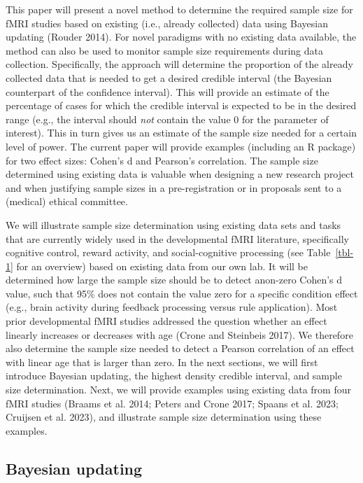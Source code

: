 \documentclass[
  letterpaper,
  DIV=11,
  numbers=noendperiod]{scrartcl}
\begin{document}
This paper will present a novel method to determine the required sample
size for fMRI studies based on existing (i.e., already collected) data
using Bayesian updating (Rouder 2014). For novel paradigms with no
existing data available, the method can also be used to monitor sample
size requirements during data collection. Specifically, the approach
will determine the proportion of the already collected data that is
needed to get a desired credible interval (the Bayesian counterpart of
the confidence interval). This will provide an estimate of the
percentage of cases for which the credible interval is expected to be in
the desired range (e.g., the interval should \emph{not} contain the
value 0 for the parameter of interest). This in turn gives us an
estimate of the sample size needed for a certain level of power. The
current paper will provide examples (including an R package) for two
effect sizes: Cohen's d and Pearson's correlation. The sample size
determined using existing data is valuable when designing a new research
project and when justifying sample sizes in a pre-registration or in
proposals sent to a (medical) ethical committee.

We will illustrate sample size determination using existing data sets
and tasks that are currently widely used in the developmental fMRI
literature, specifically cognitive control, reward activity, and
social-cognitive processing (see Table~\ref{tbl-1} for an overview)
based on existing data from our own lab. It will be determined how large
the sample size should be to detect anon-zero Cohen's d value, such that
95\% does not contain the value zero for a specific condition effect
(e.g., brain activity during feedback processing versus rule
application). Most prior developmental fMRI studies addressed the
question whether an effect linearly increases or decreases with age
(Crone and Steinbeis 2017). We therefore also determine the sample size
needed to detect a Pearson correlation of an effect with linear age that
is larger than zero. In the next sections, we will first introduce
Bayesian updating, the highest density credible interval, and sample
size determination. Next, we will provide examples using existing data
from four fMRI studies (Braams et al. 2014; Peters and Crone 2017;
Spaans et al. 2023; Cruijsen et al. 2023), and illustrate sample size
determination using these examples.

\subsection{Bayesian updating}\label{bayesian-updating}
\end{document}
